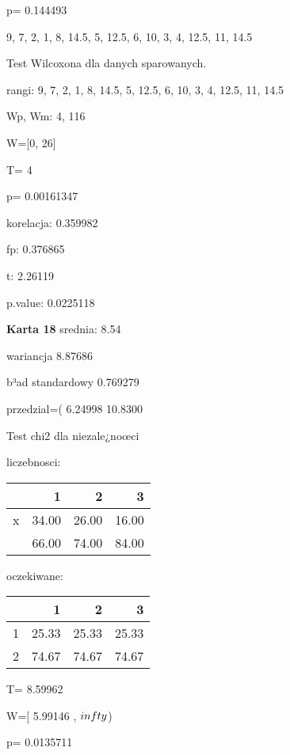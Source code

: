 \documentclass[a4paper,12pt]{article}
\begin{document}
\begin{multicols}{3}
   p= 0.144493 \vspace{1cm} 

  9, 7, 2, 1, 8, 14.5, 5, 12.5, 6, 10, 3, 4, 12.5, 11, 14.5 

  Test Wilcoxona dla danych sparowanych. 
  
  rangi: 9, 7, 2, 1, 8, 14.5, 5, 12.5, 6, 10, 3, 4, 12.5, 11, 14.5 
  
  Wp, Wm:  4,  116 
  
  W=[0, 26]  
  
  T=  4 
  
  p= 0.00161347 \vspace{1cm} 

  korelacja: 0.359982
     
     fp: 0.376865
     
     t: 2.26119
     
     p.value: 0.0225118 \vspace{1cm} 

  \textbf{Karta  18 } 
 srednia: 8.54 
     
     wariancja 8.87686  
     
     b³ad standardowy 0.769279 
     
     przedzial=( 6.24998 10.8300 \vspace{1cm} 

  Test chi2 dla niezale¿noœci 
   
   liczebnosci: %
\begin{tabular}{rrrr}
  \hline
 & 1 & 2 & 3 \\
  \hline
x & 34.00 & 26.00 & 16.00 \\
   & 66.00 & 74.00 & 84.00 \\
   \hline
\end{tabular}
 
   
   oczekiwane: %
\begin{tabular}{rrrr}
  \hline
 & 1 & 2 & 3 \\
  \hline
1 & 25.33 & 25.33 & 25.33 \\
  2 & 74.67 & 74.67 & 74.67 \\
   \hline
\end{tabular}
 
   
   T= 8.59962 
   
   W=[ 5.99146 , $\\infty$) 
   
   p= 0.0135711 \vspace{1cm} 


\end{multicols}
\end{document}
